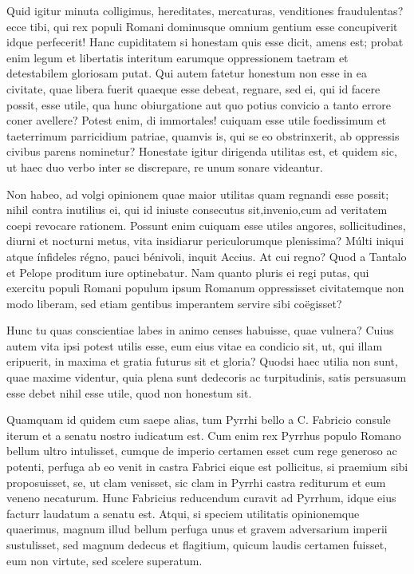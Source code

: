  Quid igitur minuta colligimus, hereditates, mercaturas, venditiones fraudulentas? ecce tibi, qui rex populi Romani dominusque omnium gentium esse concupiverit idque perfecerit! Hanc cupiditatem si honestam quis esse dicit, amens est; probat enim legum et libertatis interitum earumque oppressionem taetram et detestabilem gloriosam putat. Qui autem fatetur honestum non esse in ea civitate, quae libera fuerit quaeque esse debeat, regnare, sed ei, qui id facere possit, esse utile, qua hunc obiurgatione aut quo potius convicio a tanto errore coner avellere? Potest enim, di immortales! cuiquam esse utile foedissimum et taeterrimum parricidium patriae, quamvis is, qui se eo obstrinxerit, ab oppressis civibus parens nominetur? Honestate igitur dirigenda utilitas est, et quidem sic, ut haec duo verbo inter se discrepare, re unum sonare videantur.

 Non habeo, ad volgi opinionem quae maior utilitas quam regnandi esse possit; nihil contra inutilius ei, qui id iniuste consecutus sit,invenio,cum ad veritatem coepi revocare rationem. Possunt enim cuiquam esse utiles angores, sollicitudines, diurni et nocturni metus, vita insidiarur periculorumque plenissima? Múlti iniqui atque ínfideles régno, pauci bénivoli, inquit Accius. At cui regno? Quod a Tantalo et Pelope proditum iure optinebatur. Nam quanto pluris ei regi putas, qui exercitu populi Romani populum ipsum Romanum oppressisset civitatemque non modo liberam, sed etiam gentibus imperantem servire sibi coëgisset?

 Hunc tu quas conscientiae labes in animo censes habuisse, quae vulnera? Cuius autem vita ipsi potest utilis esse, eum eius vitae ea condicio sit, ut, qui illam eripuerit, in maxima et gratia futurus sit et gloria? Quodsi haec utilia non sunt, quae maxime videntur, quia plena sunt dedecoris ac turpitudinis, satis persuasum esse debet nihil esse utile, quod non honestum sit.

 Quamquam id quidem cum saepe alias, tum Pyrrhi bello a C. Fabricio consule iterum et a senatu nostro iudicatum est. Cum enim rex Pyrrhus populo Romano bellum ultro intulisset, cumque de imperio certamen esset cum rege generoso ac potenti, perfuga ab eo venit in castra Fabrici eique est pollicitus, si praemium sibi proposuisset, se, ut clam venisset, sic clam in Pyrrhi castra rediturum et eum veneno necaturum. Hunc Fabricius reducendum curavit ad Pyrrhum, idque eius facturr laudatum a senatu est. Atqui, si speciem utilitatis opinionemque quaerimus, magnum illud bellum perfuga unus et gravem adversarium imperii sustulisset, sed magnum dedecus et flagitium, quicum laudis certamen fuisset, eum non virtute, sed scelere superatum.

